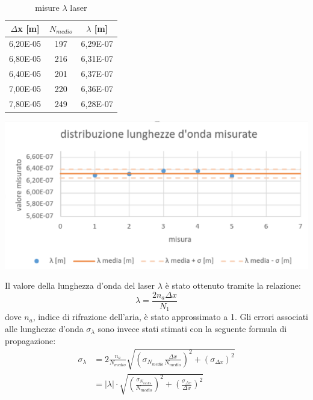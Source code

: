 \documentclass{article}
\begin{document}
    
     \begin{table}[H]
        \begin{minipage}[b]{0.35\linewidth}
            \begin{tabular}{ ccc } 
                \toprule 
                $\Delta$x [m] & $N_{medio}$ & $\lambda$ [m] \\
                \midrule 
                6,20E-05 & 197 & 6,29E-07 \\
                6,80E-05 & 216 & 6,31E-07 \\
                6,40E-05 & 201 & 6,37E-07 \\
                7,00E-05 & 220 & 6,36E-07 \\
                7,80E-05 & 249 & 6,28E-07 \\
                \bottomrule           
            \end{tabular}
            \caption{misure $\lambda$ laser}
            \label{misure laser}
            \end{minipage}
            \begin{minipage}[b]{0.65\linewidth}
            \centering
                \includegraphics[scale = 0.4]{../images/graph_laser.png}
                
                \label{graph:laser}
                
            \end{minipage}
        \end{table}

        
    Il valore della lunghezza d'onda del laser $\lambda$ è stato ottenuto tramite la relazione:
        \[\lambda = \frac{2n_a\Delta x}{N_1}\]
    dove $n_a$, indice di rifrazione dell'aria, è stato approssimato a 1. Gli errori associati alle lunghezze d'onda $\sigma_{\lambda}$ sono invece stati stimati con la seguente formula di propagazione:
    \begin{align*}
        \sigma_{\lambda} &= 2 \frac{n_{a}}{N_{medio}} \sqrt{(\sigma_{N_{medio}}\frac{\Delta x }{N_{medio}})^2 + (\sigma_{\Delta x})^2}\\
        &= |\lambda|\cdot \sqrt{(\frac{\sigma_{N_{medio}} }{N_{medio}})^2 + (\frac{\sigma_{\Delta x}}{\Delta x})^2}
    \end{align*}
    
\end{document}
